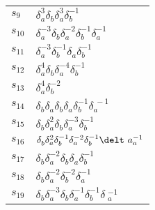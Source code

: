 \documentclass{article}
\begin{document}
\begin{center}
\begin{tabular}{ll}
$s_{9}$ & $\delta_a^{3}\delta_b^{}\delta_a^{3}\delta_b^{-1}$ \\
$s_{10}$ & $\delta_a^{-3}\delta_b^{}\delta_a^{-2}\delta_b^{-1}\delta_a^{-1}$ \\
$s_{11}$ & $\delta_a^{-3}\delta_b^{-1}\delta_a^{}\delta_b^{-1}$ \\
$s_{12}$ & $\delta_a^{4}\delta_b^{}\delta_a^{-4}\delta_b^{-1}$ \\
$s_{13}$ & $\delta_a^{4}\delta_b^{-2}$ \\
$s_{14}$ & $\delta_b^{}\delta_a^{}\delta_b^{}\delta_a^{}\delta_b^{-1}\delta_a^{\
-1}$ \\
$s_{15}$ & $\delta_b^{}\delta_a^{2}\delta_b^{}\delta_a^{-3}\delta_b^{-1}$ \\
$s_{16}$ & $\delta_b^{}\delta_a^{2}\delta_b^{-1}\delta_a^{-2}\delta_b^{-1}\delt\
a_a^{-1}$ \\
$s_{17}$ & $\delta_b^{}\delta_a^{-2}\delta_b^{}\delta_a^{}\delta_b^{-1}$ \\
$s_{18}$ & $\delta_b^{}\delta_a^{-2}\delta_b^{-2}\delta_a^{-1}$ \\
$s_{19}$ & $\delta_b^{}\delta_a^{-3}\delta_b^{}\delta_a^{-1}\delta_b^{-1}\delta\
_a^{-1}$ \\
\bottomrule
\end{tabular}
\end{center}

\thispagestyle{empty}
\end{document}
